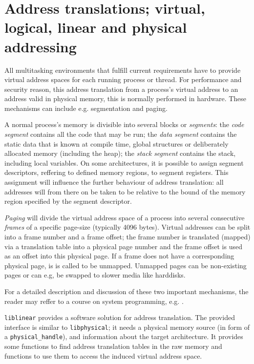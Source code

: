 %
%

\section{Address translations; virtual, logical, linear and physical addressing}
\label{address_translation}

All multitasking environments that fulfill current requirements have to provide
virtual address spaces for each running process or thread. For performance and
security reason, this address translation from a process's virtual address to an
address valid in physical memory, this is normally performed in hardware.  These
mechanisms can include e.g. segmentation and paging.

A normal process's memory is divisible into several blocks or \emph{segments}:
the \emph{code segment} contains all the code that may be run; the \emph{data
segment} contains the static data that is known at compile time, global
structures or deliberately allocated memory (including the heap); the
\emph{stack segment} contains the stack, including local variables.  On some
architectures, it is possible to assign segment descriptors, reffering to
defined memory regions, to segment registers.  This assignment will influence
the further behaviour of address translation: all addresses will from there on
be taken to be relative to the bound of the memory region specified by the
segment descriptor.

\emph{Paging} will divide the virtual address space of a process into several
consecutive \emph{frames} of a specific page-size (typically 4096 bytes).
Virtual addresses can be split into a frame number and a frame offset; the frame
number is translated (mapped) via a translation table into a physical page
number and the frame offset is used as an offset into this physical page. If a
frame does not have a corresponding physical page, is is called to be unmapped.
Unmapped pages can be non-existing pages or can e.g, be swapped to slower media
like harddisks.

For a detailed description and discussion of these two important mechanisms, the
reader may reffer to a course on system programming, e.g.
\cite{rwth_syspro_scriptum:2002}.

\texttt{liblinear} provides a software solution for address translation. The
provided interface is similar to \texttt{libphysical}; it needs a physical
memory source (in form of a \texttt{physical\_handle}), and information about
the target architecture. It provides some functions to find address translation
tables in the raw memory and functions to use them to access the induced virtual
address space.



